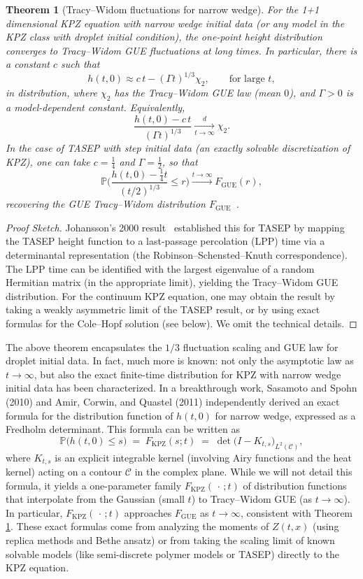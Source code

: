 \documentclass[letterpaper,11pt,oneside,reqno]{article}
\numberwithin{equation}{section}
\newtheorem{theorem}[proposition]{Theorem}
\theoremstyle{definition}
\begin{document}
\begin{theorem}[Tracy–Widom fluctuations for narrow wedge]\label{thm:nw-TW}
For the 1+1 dimensional KPZ equation with narrow wedge initial data (or any model in the KPZ class with droplet initial condition), the one-point height distribution converges to Tracy–Widom GUE fluctuations at long times. In particular, there is a constant $c$ such that
\[ h(t,0) \approx c\,t - (\Gamma t)^{1/3}\chi_2, \qquad \text{for large } t, \]
in distribution, where $\chi_2$ has the Tracy–Widom GUE law (mean $0$), and $\Gamma>0$ is a model-dependent constant. Equivalently,
\[ \frac{h(t,0) - c\,t}{(\Gamma t)^{1/3}} \xrightarrow[t\to\infty]{d} \chi_2.\]
In the case of TASEP with step initial data (an exactly solvable discretization of KPZ), one can take $c=\frac{1}{4}$ and $\Gamma=\frac{1}{2}$, so that
\[ \mathbb{P}\!\Big( \frac{h(t,0) - \frac{1}{4}t}{(t/2)^{1/3}} \le r \Big) \xrightarrow{t\to\infty} F_{\mathrm{GUE}}(r), \]
recovering the GUE Tracy–Widom distribution $F_{\mathrm{GUE}}$ \cite{Johansson2000}.
\end{theorem}

\begin{proof}[Proof Sketch] Johansson’s 2000 result \cite{Johansson2000} established this for TASEP by mapping the TASEP height function to a last-passage percolation (LPP) time via a determinantal representation (the Robinson–Schensted–Knuth correspondence). The LPP time can be identified with the largest eigenvalue of a random Hermitian matrix (in the appropriate limit), yielding the Tracy–Widom GUE distribution. For the continuum KPZ equation, one may obtain the result by taking a weakly asymmetric limit of the TASEP result, or by using exact formulas for the Cole–Hopf solution (see below). We omit the technical details.
\end{proof}

The above theorem encapsulates the $1/3$ fluctuation scaling and GUE law for droplet initial data. In fact, much more is known: not only the asymptotic law as $t\to\infty$, but also the exact finite-time distribution for KPZ with narrow wedge initial data has been characterized. In a breakthrough work, Sasamoto and Spohn (2010) and Amir, Corwin, and Quastel (2011) independently derived an exact formula for the distribution function of $h(t,0)$ for narrow wedge, expressed as a Fredholm determinant. This formula can be written as
\[ \mathbb{P}\!\big(h(t,0) \le s\big) \;=\; F_{\text{KPZ}}(s;t) \;=\; \det\!\big(I - K_{t,s}\big)_{L^2(\mathcal{C})}, \]
where $K_{t,s}$ is an explicit integrable kernel (involving Airy functions and the heat kernel) acting on a contour $\mathcal{C}$ in the complex plane. While we will not detail this formula, it yields a one-parameter family $F_{\text{KPZ}}(\,\cdot\,;t)$ of distribution functions that interpolate from the Gaussian (small $t$) to Tracy–Widom GUE (as $t\to\infty$). In particular, $F_{\text{KPZ}}(\,\cdot\,;t)$ approaches $F_{\mathrm{GUE}}$ as $t\to\infty$, consistent with Theorem \ref{thm:nw-TW}. These exact formulas come from analyzing the moments of $Z(t,x)$ (using replica methods and Bethe ansatz) or from taking the scaling limit of known solvable models (like semi-discrete polymer models or TASEP) directly to the KPZ equation.
\end{document}
